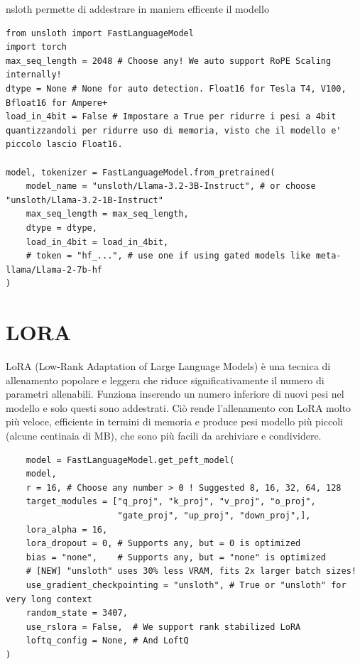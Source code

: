 \documentclass[12pt,a4paper,openright,twoside]{book}
\begin{document}
nsloth permette di addestrare in maniera efficente il modello

\begin{lstlisting}
from unsloth import FastLanguageModel
import torch
max_seq_length = 2048 # Choose any! We auto support RoPE Scaling internally!
dtype = None # None for auto detection. Float16 for Tesla T4, V100, Bfloat16 for Ampere+
load_in_4bit = False # Impostare a True per ridurre i pesi a 4bit quantizzandoli per ridurre uso di memoria, visto che il modello e' piccolo lascio Float16. 

model, tokenizer = FastLanguageModel.from_pretrained(
    model_name = "unsloth/Llama-3.2-3B-Instruct", # or choose "unsloth/Llama-3.2-1B-Instruct"
    max_seq_length = max_seq_length,
    dtype = dtype,
    load_in_4bit = load_in_4bit,
    # token = "hf_...", # use one if using gated models like meta-llama/Llama-2-7b-hf
)
\end{lstlisting}

\section{LORA}
LoRA (Low-Rank Adaptation of Large Language Models)
è una tecnica di allenamento popolare e leggera che riduce significativamente il numero di parametri allenabili. Funziona inserendo un numero inferiore di nuovi pesi nel modello e solo questi sono addestrati. Ciò rende l'allenamento con LoRA molto più veloce, efficiente in termini di memoria e produce pesi modello più piccoli (alcune centinaia di MB), che sono più facili da archiviare e condividere.

\begin{lstlisting}
    model = FastLanguageModel.get_peft_model(
    model,
    r = 16, # Choose any number > 0 ! Suggested 8, 16, 32, 64, 128
    target_modules = ["q_proj", "k_proj", "v_proj", "o_proj",
                      "gate_proj", "up_proj", "down_proj",],
    lora_alpha = 16,
    lora_dropout = 0, # Supports any, but = 0 is optimized
    bias = "none",    # Supports any, but = "none" is optimized
    # [NEW] "unsloth" uses 30% less VRAM, fits 2x larger batch sizes!
    use_gradient_checkpointing = "unsloth", # True or "unsloth" for very long context
    random_state = 3407,
    use_rslora = False,  # We support rank stabilized LoRA
    loftq_config = None, # And LoftQ
)
\end{lstlisting}
\end{document}
